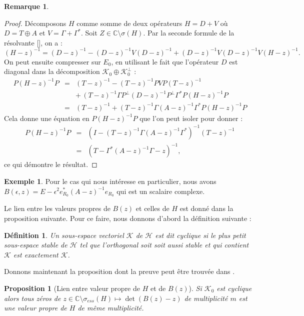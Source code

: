 \documentclass[12pt,openany,a4paper, titlepage]{article}
\newcommand{\lp}{\left(}
\newcommand{\rp}{\right)}
\newcommand{\C}{\mathbb{C}}
\newcommand{\HH}{\mathcal{H}}
\newcommand{\inv}{^{-1}}
\newtheorem{Def}{Définition}
\newtheorem{prop}{Proposition}
\theoremstyle{definition}
\theoremstyle{definition}
\theoremstyle{definition}
\newtheorem{ex}{Exemple}
\theoremstyle{definition}
\theoremstyle{definition}
\newtheorem{rem}{Remarque}
\theoremstyle{definition}
\begin{document}
\begin{rem}
\begin{proof}
    Décomposons $H$ comme somme de deux opérateurs $H = D + V$ où $D = T\oplus A$ et $V = \Gamma + \Gamma^*$. Soit $Z \in\C\setminus\sigma(H)$. Par la seconde formule de la résolvante [], on a :
    \begin{equation}
        (H-z)^{-1} = (D-z)^{-1} - (D-z)^{-1}V(D-z)^{-1} + (D-z)^{-1}V(D-z)^{-1}V(H-z)^{-1}.
    \end{equation}
    On peut ensuite compresser sur $E_0$, en utilisant le fait que l'opérateur $D$ est diagonal dans la décomposition $\mathcal{K}_0 \oplus \mathcal{K}_0^\perp$ :
    \begin{eqnarray}
        P(H-z)^{-1}P &=&  (T-z)^{-1} - (T-z)^{-1}PVP(T-z)^{-1} \\
        & & + \, (T-z)^{-1}\Gamma P^\perp (D-z)^{-1} P^\perp \Gamma^* P(H-z)^{-1}P \\
        & = & (T-z)^{-1} + (T-z)^{-1}\Gamma (A-z)^{-1}  \Gamma^* P(H-z)^{-1}P
    \end{eqnarray}
    Cela donne une équation en $P(H-z)^{-1}P$ que l'on peut isoler pour donner :
    \begin{eqnarray}
        P(H-z)^{-1}P &=& \lp I -   (T-z)^{-1}\Gamma (A-z)^{-1}  \Gamma^*\rp^{-1} (T-z)^{-1} \\
        &=& \lp T -\Gamma^*(A-z)^{-1}\Gamma - z\rp^{-1},
    \end{eqnarray}
    ce qui démontre le résultat.
\end{proof}

\begin{ex}
    Pour le cas qui nous intéresse en particulier, nous avons $B(\epsilon,z) = E - \epsilon^2 e_{R_0}^*(A-z)\inv e_{R_0}$ qui est un scalaire complexe.
\end{ex}

Le lien entre les valeurs propres de $B(z)$ et celles de $H$ est donné dans la proposition suivante. Pour ce faire, nous donnons d'abord la définition suivante :
\begin{Def}
    Un sous-espace vectoriel $\mathcal{K}$ de $\HH$ est dit cyclique si le plus petit sous-espace stable de $\HH$ tel que l'orthogonal soit soit aussi stable et qui contient $\mathcal{K}$ est exactement $\mathcal{K}$. 
\end{Def}

Donnons maintenant la proposition dont la preuve peut être trouvée dans \cite{HOWLAND1975415}.

\begin{prop}[Lien entre valeur propre de $H$ et de $B(z)$]\label{link_vp}
Si $\mathcal{K}_0$ est cyclique alors tous zéros de $z\in \C\setminus \sigma_{ess}(H) \mapsto \det \lp B(z) -z \rp$ de multiplicité $m$ est une valeur propre de $H$ de même multiplicité.
\end{prop}


\end{rem}
\end{document}
